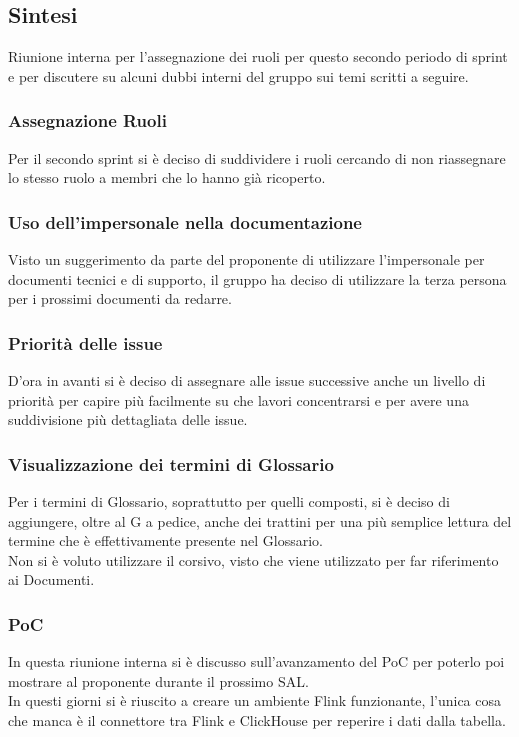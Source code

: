 \documentclass[10pt]{article}
\begin{document}
\subsection{Sintesi}
Riunione interna per l'assegnazione dei ruoli per questo secondo periodo di sprint e per discutere su alcuni dubbi interni del gruppo sui temi scritti a seguire.

\subsubsection{Assegnazione Ruoli}
Per il secondo sprint si è deciso di suddividere i ruoli cercando di non riassegnare lo stesso ruolo a membri che lo hanno già ricoperto.

\subsubsection{Uso dell'impersonale nella documentazione}
Visto un suggerimento da parte del proponente di utilizzare l'impersonale per documenti tecnici e di supporto, il gruppo ha deciso di utilizzare la terza persona per i prossimi documenti da redarre.

\subsubsection{Priorità delle issue}
D'ora in avanti si è deciso di assegnare alle issue successive anche un livello di priorità per capire più facilmente su che lavori concentrarsi e per avere una suddivisione più dettagliata delle issue.

\subsubsection{Visualizzazione dei termini di Glossario}
Per i termini di Glossario, soprattutto per quelli composti, si è deciso di aggiungere, oltre al G a pedice, anche dei trattini per una più semplice lettura del termine che è effettivamente presente nel Glossario.\\
Non si è voluto utilizzare il corsivo, visto che viene utilizzato per far riferimento ai Documenti.

\subsubsection{PoC}
In questa riunione interna si è discusso sull'avanzamento del PoC per poterlo poi mostrare al proponente durante il prossimo SAL.\\
In questi giorni si è riuscito a creare un ambiente Flink funzionante, l'unica cosa che manca è il connettore tra Flink e ClickHouse per reperire i dati dalla tabella.
\end{document}
